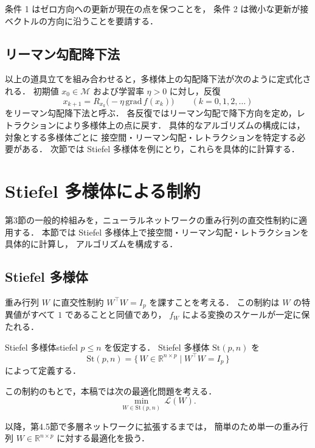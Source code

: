 \documentclass[uplatex, dvipdfmx]{jsarticle}
\begin{document}
条件 1 はゼロ方向への更新が現在の点を保つことを，
条件 2 は微小な更新が接ベクトルの方向に沿うことを要請する．

\subsection{リーマン勾配降下法}

以上の道具立てを組み合わせると，多様体上の勾配降下法が次のように定式化される．
初期値 $x_0 \in \mathcal{M}$ および学習率 $\eta > 0$ に対し，反復
\[
x_{k+1} = R_{x_k}\bigl(-\eta\,\mathrm{grad}\, f(x_k)\bigr)
\qquad (k = 0, 1, 2, \ldots)
\]
をリーマン勾配降下法と呼ぶ．
各反復ではリーマン勾配で降下方向を定め，レトラクションにより多様体上の点に戻す．
具体的なアルゴリズムの構成には，対象とする多様体ごとに
接空間・リーマン勾配・レトラクションを特定する必要がある．
次節では Stiefel 多様体を例にとり，これらを具体的に計算する．

\section{Stiefel 多様体による制約}

第3節の一般的枠組みを，ニューラルネットワークの重み行列の直交性制約に適用する．
本節では Stiefel 多様体上で接空間・リーマン勾配・レトラクションを具体的に計算し，
アルゴリズムを構成する．

\subsection{Stiefel 多様体}

重み行列 $W$ に直交性制約 $W^\top W=I_p$ を課すことを考える．
この制約は $W$ の特異値がすべて $1$ であることと同値であり，
$f_W$ による変換のスケールが一定に保たれる．

\begin{definition}{Stiefel 多様体}{stiefel}
$p\le n$ を仮定する．
Stiefel 多様体 $\mathrm{St}(p,n)$ を
\[
\mathrm{St}(p,n)
=
\{\, W\in\mathbb{R}^{n\times p}\mid W^\top W = I_p \,\}
\]
によって定義する．
\end{definition}

この制約のもとで，本稿では次の最適化問題を考える．
\[
\min_{W\in\mathrm{St}(p,n)}\, \mathcal{L}(W).
\]

以降，第4.5節で多層ネットワークに拡張するまでは，
簡単のため単一の重み行列 $W\in\mathbb{R}^{n\times p}$ に対する最適化を扱う．
\end{document}
